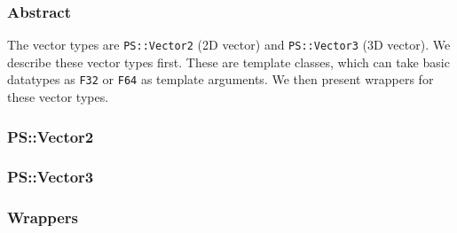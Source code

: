 \subsubsection{Abstract}

The vector types are \texttt{PS::Vector2} (2D vector) and
\texttt{PS::Vector3} (3D vector). We describe these vector types first.
These are template classes, which can take basic datatypes
as \texttt{F32} or \texttt{F64} as template arguments. We then present
wrappers for these vector types.


\subsubsection{PS::Vector2}



\subsubsection{PS::Vector3}



\subsubsection{Wrappers}



